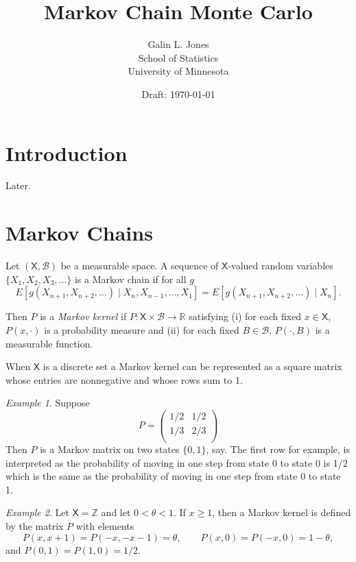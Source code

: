 \documentclass[12pt]{article}
\title{Markov Chain Monte Carlo}
\author{Galin L. Jones\\
{\small School of Statistics}\\
{\small University of Minnesota}}
\date{Draft: \today}
\theoremstyle{plain}
\theoremstyle{definition}
\theoremstyle{remark}
\newtheorem{example}{Example}[section]
\newcommand{\X}{\mathsf{X}}
\newcommand{\real}{\mathbb{R}}
\begin{document}
\maketitle

\tableofcontents

\section{Introduction}
\label{mcmc:sec:intro}

Later.

\section{Markov Chains}
\label{mcmc:sec:markov}

Let $(\X, \mathcal{B})$ be a measurable space.  A sequence of
$\X$-valued random variables $\{X_1, X_2, X_3, \ldots \}$ is a Markov
chain if for all $g$
\[
E\left[ g(X_{n+1}, X_{n+2}, \ldots) \mid X_n, X_{n-1}, \ldots, X_1
\right] = E\left[ g(X_{n+1}, X_{n+2}, \ldots) \mid X_n\right].
\]

Then $P$ is a {\em Markov kernel}
if $P : \X \times \mathcal{B} \to \real$ satisfying (i) for each fixed
$x \in \X$, $P(x, \cdot)$ is a probability measure and (ii) for each fixed
$B \in \mathcal{B}$, $P(\cdot, B)$ is a measurable function.  

When $\X$ is a discrete set a Markov kernel can be represented as a
square matrix whose entries are nonnegative and whose rows sum to 1.

\begin{example}
  Suppose
  \[
    P= \begin{pmatrix}
      1/2 & 1/2 \\
      1/3 & 2/3\\
      \end{pmatrix}
  \]
  Then $P$ is  a Markov matrix on two states $\{0, 1\}$, say.  The
  first row for example, is interpreted as
  the probability of moving in one step from state 0 to state 0 is 1/2
  which is the same as the probability of moving in one step from state 0 to state 1.
 \end{example}

\begin{example}
  Let $\X=\mathbb{Z}$ and let $0 < \theta < 1$.  If $x \ge 1$, then a
  Markov kernel is defined by the matrix $P$ with elements
  \[
    P(x, x+1) = P(-x, -x-1) = \theta, \quad \quad P(x,0)=P(-x,0) = 1- \theta,
  \]
  and $P(0,1)=P(1,0) =1/2$.
\end{example}
\end{document}
